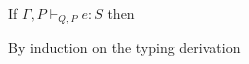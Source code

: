 \begin{theorem}
If $\Gamma, P \vdash_{Q,P} e : S$ then 
\end{theorem}

\begin{proofIdea}
By induction on the typing derivation
\end{proofIdea}